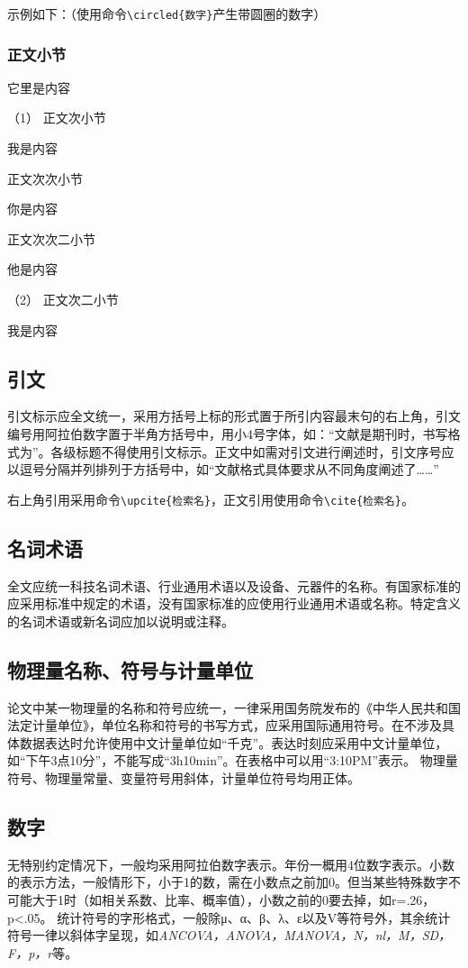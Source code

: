 \documentclass[a4paper,fancyhdr,fntef,UTF8,hyperref,openany,oneside,notitlepage]{book}%
\begin{document}
示例如下：（使用命令\verb|\circled{数字}|产生带圆圈的数字）

\subsubsection{正文小节}
它里是内容

（1） 正文次小节 \par
我是内容

 正文次次小节\par
你是内容

 正文次次二小节\par
他是内容

（2） 正文次二小节\par
我是内容


\subsection{引文}
引文标示应全文统一，采用方括号上标的形式置于所引内容最末句的右上角，引文编号用阿拉伯数字置于半角方括号中，用小4号字体，如：“文献是期刊时，书写格式为\cite{J}”。各级标题不得使用引文标示。正文中如需对引文进行阐述时，引文序号应以逗号分隔并列排列于方括号中，如“文献格式具体要求\cite{M,J,O}从不同角度阐述了……”

右上角引用采用命令\verb|\upcite{检索名}|，正文引用使用命令\verb|\cite{检索名}|。

\subsection{名词术语}
全文应统一科技名词术语、行业通用术语以及设备、元器件的名称。有国家标准的应采用标准中规定的术语，没有国家标准的应使用行业通用术语或名称。特定含义的名词术语或新名词应加以说明或注释。

\subsection{物理量名称、符号与计量单位}
论文中某一物理量的名称和符号应统一，一律采用国务院发布的《中华人民共和国法定计量单位》，单位名称和符号的书写方式，应采用国际通用符号。在不涉及具体数据表达时允许使用中文计量单位如“千克”。表达时刻应采用中文计量单位，如“下午3点10分”，不能写成“3h10min”。在表格中可以用“3:10PM”表示。
物理量符号、物理量常量、变量符号用斜体，计量单位符号均用正体。

\subsection{数字}
无特别约定情况下，一般均采用阿拉伯数字表示。年份一概用4位数字表示。小数的表示方法，一般情形下，小于1的数，需在小数点之前加0。但当某些特殊数字不可能大于1时（如相关系数、比率、概率值），小数之前的0要去掉，如r=.26，p<.05。
统计符号的字形格式，一般除μ、α、β、λ、ε以及V等符号外，其余统计符号一律以斜体字呈现，如\emph{ANCOVA，ANOVA，MANOVA，N，nl，M，SD，F，p，r}等。
\end{document}
